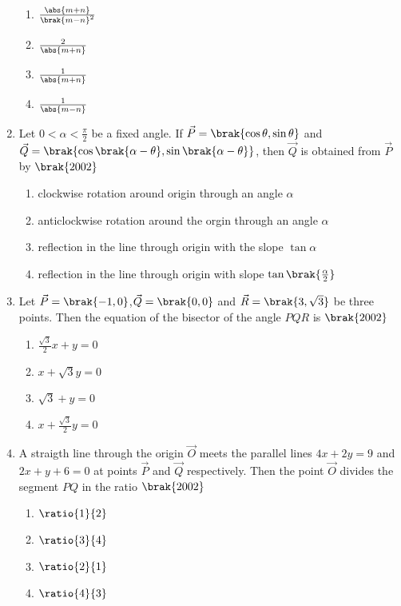 \begin{enumerate}[label=\thesubsection.\arabic*.,ref=\thesubsection.\theenumi]
\begin{multicols}{4}
\begin{enumerate}
     \item $\frac{\abs{m+n}}{\brak{m-n}^2}$
     \item $\frac{2}{\abs{m+n}}$
     \item $\frac{1}{\abs{m+n}}$
     \item $\frac{1}{\abs{m-n}}$
    
\end{enumerate}
\end{multicols}
\item Let $0 < \alpha < \frac{\pi}{2}$ be a fixed angle. If
$\vec{P}=\brak{\cos\theta,\sin\theta}$ and $\vec{Q}=\brak{\cos\brak{\alpha-\theta}, \sin\brak{\alpha-\theta}}$, then $\vec{Q}$ is obtained from $\vec{P}$ by
\hfill{$\brak{2002}$}
\begin{enumerate}
    \item clockwise rotation around origin through an angle $\alpha$
    \item anticlockwise rotation around the orgin through an angle $\alpha$
    \item reflection in the line through origin with the slope $\tan\alpha$
    \item reflection in the line through origin with slope $\tan\brak{\frac{\alpha}{2}}$
\end{enumerate}
\item Let $\vec{P}=\brak{-1,0}$,$\vec{Q}=\brak{0,0}$ and $\vec{R}=\brak{3,\sqrt{3}}$ be three points. Then the equation of the bisector of the angle $PQR$ is 
\hfill{$\brak{2002}$}
\begin{multicols}{2}
\begin{enumerate}
    
        \item $\frac{\sqrt{3}}{2}x+y=0$
        \item $x+\sqrt{3}y=0$
        \item $\sqrt{3}+y=0$
        \item $x+\frac{\sqrt{3}}{2}y=0$
    
\end{enumerate}
\end{multicols}
\item A straigth line through the origin $\vec{O}$ meets the parallel lines $4x+2y=9$ and $2x+y+6=0$ at points $\vec{P}$ and $\vec{Q}$ respectively. Then the point $\vec{O}$ divides the segment $PQ$ in the ratio 
\hfill{$\brak{2002}$}
\begin{multicols}{4}
\begin{enumerate}

     \item $\ratio{1}{2}$
     \item $\ratio{3}{4}$
     \item $\ratio{2}{1}$
     \item $\ratio{4}{3}$


\end{enumerate}
\end{multicols}
\end{enumerate}
